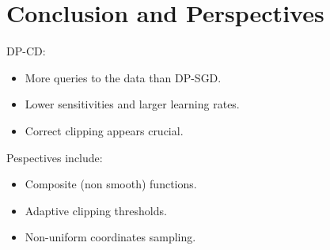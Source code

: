 \documentclass{beamer}
\begin{document}


\section{Conclusion and Perspectives}

\begin{frame}

  DP-CD:
  \begin{itemize}
  \item More queries to the data than DP-SGD.
  \item Lower sensitivities and larger learning rates.
  \item Correct clipping appears crucial.
  \end{itemize}

  \pause

  \vspace{1em}

  Pespectives include:
  \begin{itemize}
    \setlength\itemsep{1em}
  \item \alert{Composite} (non smooth) functions.
  \item \alert{Adaptive} clipping thresholds.
  \item \alert{Non-uniform} coordinates sampling.
  \end{itemize}
\end{frame}
\end{document}

